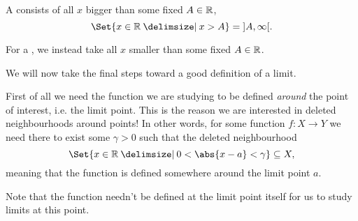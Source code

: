 \begin{example}
	A  consists of all $x$ bigger than some fixed $A \in \mathbb{R}$,
	\[
		\Set{x \in \R \given x > A} = \interval[open]{A}{\infty}.
	\]

	\begin{figure}[H]
		\centering
	\end{figure}

	\noindent
	For a , we instead take all $x$ smaller than some fixed $A \in \mathbb{R}$.
\end{example}


We will now take the final steps toward a good definition of a limit.

 First of all we need the function we are studying to be defined \emph{around} the point of interest, i.e. the limit point.
This is the reason we are interested in deleted neighbourhoods around points!
In other words, for some function $f \colon X \to Y$ we need there to exist some $\gamma > 0$ such that the deleted neighbourhood
\[
	\Set{x \in \R \given 0 < \abs{x - a} < \gamma} \subseteq X,
\]
meaning that the function is defined somewhere around the limit point $a$.

\begin{remark}
	Note that the function needn't be defined at the limit point itself for us to study limits at this point.
\end{remark}

